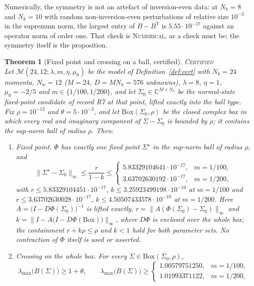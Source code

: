\documentclass[11pt]{article}
\newcommand{\CERT}{\upshape\mdseries\textsc{Certified}}
\newcommand{\NUM}{\upshape\mdseries\textsc{Numerical}}
\newtheorem{theorem}{Theorem}[section]
\theoremstyle{definition}
\theoremstyle{remark}
\begin{document}
Numerically, the symmetry is not an artefact of inversion-even data: at $N_k=8$ and $N_k=10$ with random non-inversion-even perturbations of relative size $10^{-3}$ in the supremum norm, the largest entry of $B-B^{\mathsf T}$ is $5.55\cdot10^{-17}$ against an operator norm of order one. That check is \NUM, as a check must be; the symmetry itself is the proposition.

\begin{theorem}[Fixed point and crossing on a ball, certified]\label{thm:C}\hfill\CERT\\
Let $\mathcal M(24,12;\lambda,m,\eta,\mu_0)$ be the model of Definition~\ref{def:cert} with $N_k=24$ momenta, $N_w=12$ ($M=24$, $D=MN_k=576$ unknowns), $\lambda=8$, $\eta=1$, $\mu_0=-2/5$ and $m\in\{1/100,1/200\}$, and let $\Sigma_0\in\mathbb C^{M\times N_k}$ be the normal-state fixed-point candidate of record R7 at that point, lifted exactly into the ball type. Fix $\rho=10^{-12}$ and $\theta=5\cdot10^{-3}$, and let $\mathrm{Box}(\Sigma_0,\rho)$ be the closed complex box in which every real and imaginary component of $\Sigma-\Sigma_0$ is bounded by $\rho$; it contains the sup-norm ball of radius $\rho$. Then:
\begin{enumerate}
\item[(N)] \emph{Fixed point.} $\Phi$ has exactly one fixed point $\Sigma^\star$ in the sup-norm ball of radius $\rho$, and
\begin{equation}\label{eq:certN}
\|\Sigma^\star-\Sigma_0\|_\infty\le\frac{r}{1-k}\le\begin{cases}5.83329104641\cdot10^{-17}, & m=1/100,\\ 3.63702630192\cdot10^{-17}, & m=1/200,\end{cases}
\end{equation}
with $r\le5.83329104451\cdot10^{-17}$, $k\le3.25923499198\cdot10^{-10}$ at $m=1/100$ and $r\le3.63702630028\cdot10^{-17}$, $k\le4.50507433578\cdot10^{-10}$ at $m=1/200$. Here $A=\big(I-D\Phi(\Sigma_0)\big)^{-1}$ is lifted exactly, $r=\|A(\Phi(\Sigma_0)-\Sigma_0)\|_\infty$ and $k=\|I-A\big(I-D\Phi(\mathrm{Box})\big)\|_\infty$, where $D\Phi$ is enclosed over the whole box; the containment $r+k\rho\le\rho$ and $k<1$ hold for both parameter sets. No contraction of $\Phi$ itself is used or asserted.
\item[(K)] \emph{Crossing on the whole box.} For every $\Sigma\in\mathrm{Box}(\Sigma_0,\rho)$,
\begin{equation}\label{eq:certK}
\lambda_{\max}\big(B(\Sigma)\big)\ge1+\theta,\qquad
\lambda_{\max}\big(B(\Sigma)\big)\ge\begin{cases}1.00579751250,&m=1/100,\\1.01993371122,&m=1/200,\end{cases}

\end{equation}
\end{enumerate}
\end{theorem}
\end{document}
